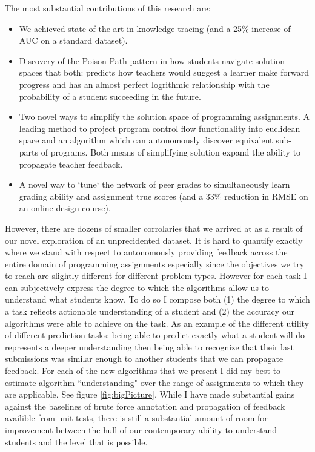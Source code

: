 The most substantial contributions of this research are:
\begin{itemize}
\item We achieved state of the art in knowledge tracing (and a 25\% increase of AUC on a standard dataset). 

\item Discovery of the Poison Path pattern in how students navigate solution spaces that both: predicts how teachers would suggest a learner make forward progress and has an almost perfect logrithmic relationship with the probability of a student succeeding in the future.

\item Two novel ways to simplify the solution space of programming assignments. A leading method to project program control flow functionality into euclidean space and an algorithm which can autonomously discover equivalent sub-parts of programs. Both means of simplifying solution expand the ability to propagate teacher feedback.

\item A novel way to `tune` the network of peer grades to simultaneously learn grading ability and assignment true scores (and a 33\% reduction in RMSE on an online design course).

\end{itemize}
However, there are dozens of smaller corrolaries that we arrived at as a result of our novel exploration of an unprecidented dataset. It is hard to quantify exactly where we stand with respect to autonomously providing feedback across the entire domain of programming assignments especially since the objectives we try to reach are slightly different for different problem types. However for each task I can subjectively express the degree to which the algorithms allow us to understand what students know. To do so I compose both (1) the degree to which a task reflects actionable understanding of a student and (2) the accuracy our algorithms were able to achieve on the task. As an example of the different utility of different prediction tasks: being able to predict exactly what a student will do represents a deeper understanding then being able to recognize that their last submissions was similar enough to another students that we can propagate feedback. For each of the new algorithms that we present I did my best to estimate algorithm ``understanding" over the range of assignments to which they are applicable. See figure \ref{fig:bigPicture}. While I have made substantial gains against the baselines of brute force annotation and propagation of feedback availible from unit tests, there is still a substantial amount of room for improvement between the hull of our contemporary ability to understand students and the level that is possible.

